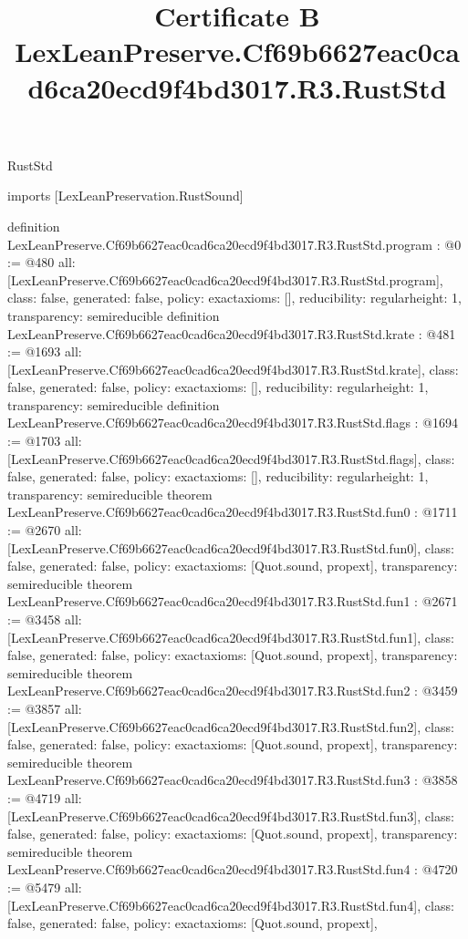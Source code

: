 \begin{lexlean}{RustStd}
\title{Certificate B LexLeanPreserve.Cf69b6627eac0cad6ca20ecd9f4bd3017.R3.RustStd}
\begin{coremodule}
imports [LexLeanPreservation.RustSound]

definition LexLeanPreserve.Cf69b6627eac0cad6ca20ecd9f4bd3017.R3.RustStd.program : @0 := @480 {
  all: [LexLeanPreserve.Cf69b6627eac0cad6ca20ecd9f4bd3017.R3.RustStd.program],
  class: false,
  generated: false,
  policy: exact{axioms: []},
  reducibility: regular{height: 1},
  transparency: semireducible
}
definition LexLeanPreserve.Cf69b6627eac0cad6ca20ecd9f4bd3017.R3.RustStd.krate : @481 := @1693 {
  all: [LexLeanPreserve.Cf69b6627eac0cad6ca20ecd9f4bd3017.R3.RustStd.krate],
  class: false,
  generated: false,
  policy: exact{axioms: []},
  reducibility: regular{height: 1},
  transparency: semireducible
}
definition LexLeanPreserve.Cf69b6627eac0cad6ca20ecd9f4bd3017.R3.RustStd.flags : @1694 := @1703 {
  all: [LexLeanPreserve.Cf69b6627eac0cad6ca20ecd9f4bd3017.R3.RustStd.flags],
  class: false,
  generated: false,
  policy: exact{axioms: []},
  reducibility: regular{height: 1},
  transparency: semireducible
}
theorem LexLeanPreserve.Cf69b6627eac0cad6ca20ecd9f4bd3017.R3.RustStd.fun0 : @1711 := @2670 {
  all: [LexLeanPreserve.Cf69b6627eac0cad6ca20ecd9f4bd3017.R3.RustStd.fun0],
  class: false,
  generated: false,
  policy: exact{axioms: [Quot.sound, propext]},
  transparency: semireducible
}
theorem LexLeanPreserve.Cf69b6627eac0cad6ca20ecd9f4bd3017.R3.RustStd.fun1 : @2671 := @3458 {
  all: [LexLeanPreserve.Cf69b6627eac0cad6ca20ecd9f4bd3017.R3.RustStd.fun1],
  class: false,
  generated: false,
  policy: exact{axioms: [Quot.sound, propext]},
  transparency: semireducible
}
theorem LexLeanPreserve.Cf69b6627eac0cad6ca20ecd9f4bd3017.R3.RustStd.fun2 : @3459 := @3857 {
  all: [LexLeanPreserve.Cf69b6627eac0cad6ca20ecd9f4bd3017.R3.RustStd.fun2],
  class: false,
  generated: false,
  policy: exact{axioms: [Quot.sound, propext]},
  transparency: semireducible
}
theorem LexLeanPreserve.Cf69b6627eac0cad6ca20ecd9f4bd3017.R3.RustStd.fun3 : @3858 := @4719 {
  all: [LexLeanPreserve.Cf69b6627eac0cad6ca20ecd9f4bd3017.R3.RustStd.fun3],
  class: false,
  generated: false,
  policy: exact{axioms: [Quot.sound, propext]},
  transparency: semireducible
}
theorem LexLeanPreserve.Cf69b6627eac0cad6ca20ecd9f4bd3017.R3.RustStd.fun4 : @4720 := @5479 {
  all: [LexLeanPreserve.Cf69b6627eac0cad6ca20ecd9f4bd3017.R3.RustStd.fun4],
  class: false,
  generated: false,
  policy: exact{axioms: [Quot.sound, propext]},
}
\end{coremodule}
\end{lexlean}
